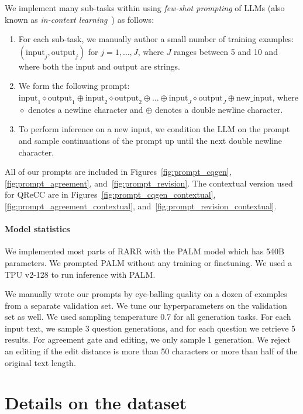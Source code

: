 We implement many sub-tasks within \approach{} using \emph{few-shot prompting} of LLMs (also known as \emph{in-context learning}~\cite{Brown2020LanguageMA}) as follows:
\begin{enumerate} \setcounter{enumi}{0}
\item
For each sub-task, we manually author a small number of training examples: \texttt{$(\text{input}_j, \text{output}_j)$} for $j=1,\ldots,J$, where $J$ ranges between 5 and 10 and where both the input and output are strings.
\item
We form the following prompt: \texttt{$\text{input}_1 \diamond \text{output}_1 \oplus \text{input}_2 \diamond \text{output}_2 \oplus \ldots \oplus \text{input}_J \diamond \text{output}_J \oplus \text{new\_input}$}, where $\diamond$ denotes a newline character and $\oplus$ denotes a double newline character.
\item
To perform inference on a new input, we condition the LLM on the prompt and sample continuations of the prompt up until the next double newline character.
\end{enumerate}
All of our prompts are included in Figures~\ref{fig:prompt_cqgen}, \ref{fig:prompt_agreement}, and~\ref{fig:prompt_revision}. The contextual version used for QReCC are in Figures~\ref{fig:prompt_cqgen_contextual}, \ref{fig:prompt_agreement_contextual}, and~\ref{fig:prompt_revision_contextual}.


\paragraph{Model statistics}


We implemented most parts of RARR with the PALM model which has 540B parameters. We prompted PALM without any training or finetuning. We used a TPU  v2-128 to run inference with PALM.

We manually wrote our prompts by eye-balling quality on a dozen of examples from a separate validation set.
We tune our hyperparameters on the validation set as well. We used sampling temperature 0.7 for all generation tasks. For each input text, we sample 3 question generations, and for each question we retrieve 5 results. For agreement gate and editing, we only sample 1 generation. We reject an editing if the edit distance is more than 50 characters or more than half of the original text length.

\section{Details on the dataset}

